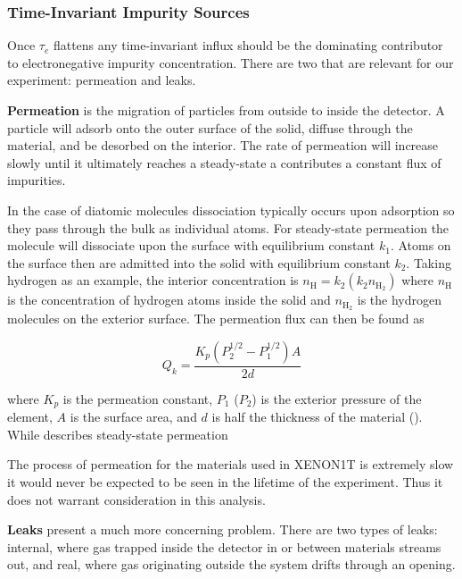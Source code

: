 \subsubsection{Time-Invariant Impurity Sources}
\label{subsubsec:electron_lifetime_model_outgassing_leak_sources}
Once $\tau_e$ flattens any time-invariant influx should be the dominating contributor to electronegative impurity concentration.  There
are two that are relevant for our experiment: permeation and leaks.

\textbf{Permeation} is the migration of particles from outside to inside the detector.  A particle will adsorb onto the outer surface of
the solid, diffuse through the material, and be desorbed on the interior.  The rate of permeation will increase slowly until it ultimately
reaches a steady-state a contributes a constant flux of impurities.

In the case of diatomic molecules dissociation typically occurs
upon adsorption so they pass through the bulk as individual atoms.  For steady-state permeation the molecule will dissociate upon the
surface with equilibrium constant $k_1$.  Atoms on the surface then are admitted into the solid with equilibrium constant $k_2$.  Taking
hydrogen as an example, the
interior concentration is $n_{\mathrm{H}} = k_2 (k_2 n_{\mathrm{H_2}})$ where $n_{\mathrm{H}}$ is the concentration of hydrogen atoms
inside the solid and $n_{\mathrm{H_2}}$ is the hydrogen molecules on the exterior surface.  The permeation flux can then be found as

\begin{equation}
Q_k = \frac{K_p (P_2^{1/2} - P_1^{1/2})A}{2d}
\label{eq:electron_lifetime_model_outgassing_leak_sources_perm}
\end{equation}

\noindent where $K_p$ is the permeation constant, $P_1$ ($P_2$) is the exterior pressure of the element, $A$ is the surface area, and
$d$ is half the thickness of the material ().  While 
describes steady-state permeation 

The process of permeation for the materials used in XENON1T is extremely slow it would never be expected to be seen in the lifetime of the
experiment.  Thus it does not warrant consideration in this analysis.

\textbf{Leaks} present a much more concerning problem.  There are two types of leaks: internal, where gas trapped inside the detector
in or between materials streams out, and real, where gas originating outside the system drifts through an opening.

